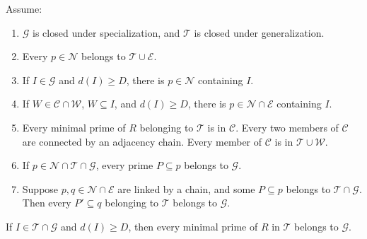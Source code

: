 \begin{srlemma}\label{lem:sr-local-propagation}
Assume:
\begin{enumerate}
\item $\mathcal G$ is closed under specialization, and $\mathcal T$
is closed under generalization.
\item Every $p\in\mathcal N$ belongs to $\mathcal T\cup\mathcal E$.
\item If $I\in\mathcal G$ and $d(I)\ge D$, there is
$p\in\mathcal N$ containing $I$.
\item If $W\in\mathcal C\cap\mathcal W$, $W\subseteq I$, and
$d(I)\ge D$, there is $p\in\mathcal N\cap\mathcal E$ containing $I$.
\item Every minimal prime of $R$ belonging to $\mathcal T$ is in
$\mathcal C$. Every two members of $\mathcal C$ are connected by an
adjacency chain. Every member of $\mathcal C$ is in
$\mathcal T\cup\mathcal W$.
\item If $p\in\mathcal N\cap\mathcal T\cap\mathcal G$, every prime
$P\subseteq p$ belongs to $\mathcal G$.
\item Suppose $p,q\in\mathcal N\cap\mathcal E$ are linked by a chain,
and some $P\subseteq p$ belongs to $\mathcal T\cap\mathcal G$.
Then every $P'\subseteq q$ belonging to $\mathcal T$ belongs to
$\mathcal G$.
\end{enumerate}
If $I\in\mathcal T\cap\mathcal G$ and $d(I)\ge D$, then every minimal
prime of $R$ in $\mathcal T$ belongs to $\mathcal G$.
\end{srlemma}
